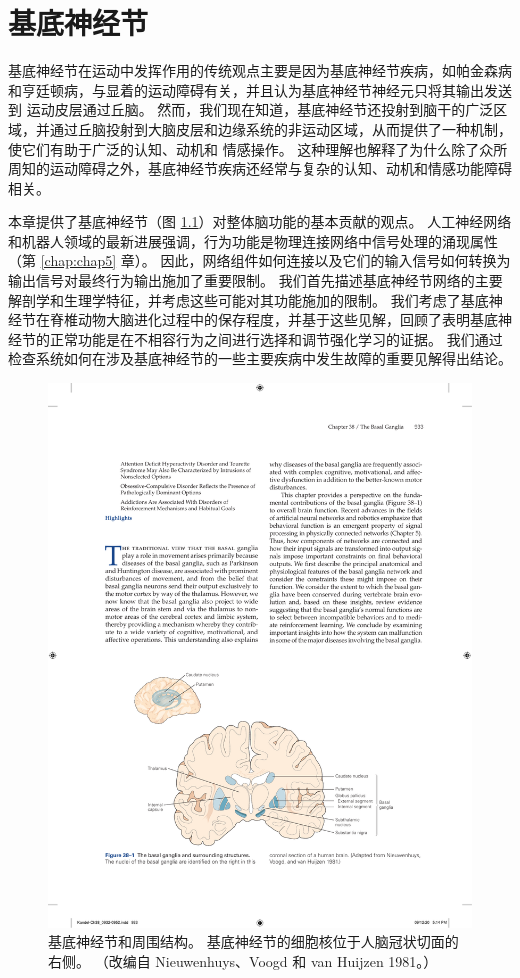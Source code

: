 \chapter{基底神经节} \label{chap:chap38}

基底神经节在运动中发挥作用的传统观点主要是因为基底神经节疾病，如帕金森病和亨廷顿病，与显着的运动障碍有关，并且认为基底神经节神经元只将其输出发送到 运动皮层通过丘脑。 然而，我们现在知道，基底神经节还投射到脑干的广泛区域，并通过丘脑投射到大脑皮层和边缘系统的非运动区域，从而提供了一种机制，使它们有助于广泛的认知、动机和 情感操作。 这种理解也解释了为什么除了众所周知的运动障碍之外，基底神经节疾病还经常与复杂的认知、动机和情感功能障碍相关。

本章提供了基底神经节（图 \ref{fig:38_1}）对整体脑功能的基本贡献的观点。 
人工神经网络和机器人领域的最新进展强调，行为功能是物理连接网络中信号处理的涌现属性（第 \ref{chap:chap5} 章）。 因此，网络组件如何连接以及它们的输入信号如何转换为输出信号对最终行为输出施加了重要限制。 我们首先描述基底神经节网络的主要解剖学和生理学特征，并考虑这些可能对其功能施加的限制。 我们考虑了基底神经节在脊椎动物大脑进化过程中的保存程度，并基于这些见解，回顾了表明基底神经节的正常功能是在不相容行为之间进行选择和调节强化学习的证据。 我们通过检查系统如何在涉及基底神经节的一些主要疾病中发生故障的重要见解得出结论。

\begin{figure}[htbp]
	\centering
	\includegraphics[width=0.8\linewidth]{chap38/fig_38_1}
	\caption{基底神经节和周围结构。 基底神经节的细胞核位于人脑冠状切面的右侧。 （改编自 Nieuwenhuys、Voogd 和 van Huijzen 1981。）}
	\label{fig:38_1}
\end{figure}

